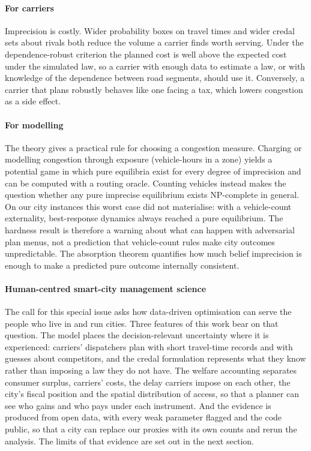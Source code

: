 \documentclass[preprint,12pt]{elsarticle}
\theoremstyle{definition}
\theoremstyle{remark}
\begin{document}
\paragraph{For carriers} Imprecision is costly. Wider probability boxes on travel times and wider credal sets about rivals both reduce the volume a carrier finds worth serving. Under the dependence-robust criterion the planned cost is well above the expected cost under the simulated law, so a carrier with enough data to estimate a law, or with knowledge of the dependence between road segments, should use it. Conversely, a carrier that plans robustly behaves like one facing a tax, which lowers congestion as a side effect.

\paragraph{For modelling} The theory gives a practical rule for choosing a congestion measure. Charging or modelling congestion through exposure (vehicle-hours in a zone) yields a potential game in which pure equilibria exist for every degree of imprecision and can be computed with a routing oracle. Counting vehicles instead makes the question whether any pure imprecise equilibrium exists NP-complete in general. On our city instances this worst case did not materialise: with a vehicle-count externality, best-response dynamics always reached a pure equilibrium. The hardness result is therefore a warning about what can happen with adversarial plan menus, not a prediction that vehicle-count rules make city outcomes unpredictable. The absorption theorem quantifies how much belief imprecision is enough to make a predicted pure outcome internally consistent.

\paragraph{Human-centred smart-city management science} The call for this special issue asks how data-driven optimisation can serve the people who live in and run cities. Three features of this work bear on that question. The model places the decision-relevant uncertainty where it is experienced: carriers' dispatchers plan with short travel-time records and with guesses about competitors, and the credal formulation represents what they know rather than imposing a law they do not have. The welfare accounting separates consumer surplus, carriers' costs, the delay carriers impose on each other, the city's fiscal position and the spatial distribution of access, so that a planner can see who gains and who pays under each instrument. And the evidence is produced from open data, with every weak parameter flagged and the code public, so that a city can replace our proxies with its own counts and rerun the analysis. The limits of that evidence are set out in the next section.
\end{document}
